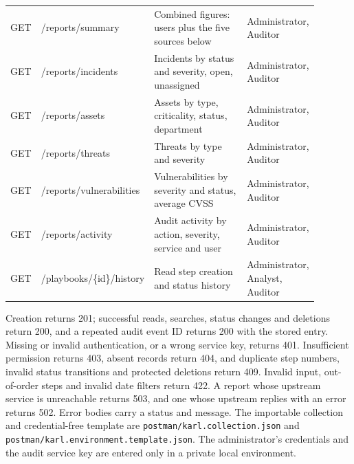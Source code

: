 \begin{small}
\begin{longtable}{>{\raggedright\arraybackslash}p{0.10\linewidth}>{\raggedright\arraybackslash}p{0.28\linewidth}>{\raggedright\arraybackslash}p{0.32\linewidth}>{\raggedright\arraybackslash}p{0.19\linewidth}}
GET & /reports/summary & Combined figures: users plus the five sources below & Administrator, Auditor \\
GET & /reports/incidents & Incidents by status and severity, open, unassigned & Administrator, Auditor \\
GET & /reports/assets & Assets by type, criticality, status, department & Administrator, Auditor \\
GET & /reports/threats & Threats by type and severity & Administrator, Auditor \\
GET & /reports/vulnerabilities & Vulnerabilities by severity and status, average CVSS & Administrator, Auditor \\
GET & /reports/activity & Audit activity by action, severity, service and user & Administrator, Auditor \\
\midrule
GET & /playbooks/\{id\}/history & Read step creation and status history & Administrator, Analyst, Auditor \\
\bottomrule
\end{longtable}
\end{small}

Creation returns 201; successful reads, searches, status changes and deletions return 200, and a repeated audit event ID returns 200 with the stored entry. Missing or invalid authentication, or a wrong service key, returns 401. Insufficient permission returns 403, absent records return 404, and duplicate step numbers, invalid status transitions and protected deletions return 409. Invalid input, out-of-order steps and invalid date filters return 422. A report whose upstream service is unreachable returns 503, and one whose upstream replies with an error returns 502. Error bodies carry a status and message. The importable collection and credential-free template are \texttt{postman/karl.collection.json} and \texttt{postman/karl.environment.template.json}. The administrator's credentials and the audit service key are entered only in a private local environment.
